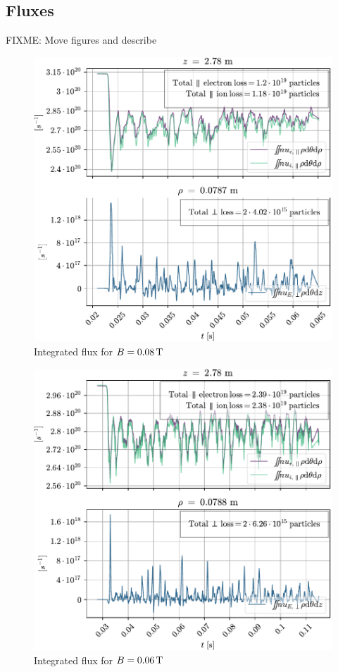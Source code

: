 \subsection{Fluxes}
FIXME: Move figures and describe
%
\begin{figure}[htb]
    \centering
    \includegraphics{fig/results/totalFlux/flux0008}
    \caption{Integrated flux for $B=0.08\, \text{T}$}
    \label{fig:flux0008}
\end{figure}
%
\begin{figure}[htb]
    \centering
    \includegraphics{fig/results/totalFlux/flux0006}
    \caption{Integrated flux for $B=0.06\, \text{T}$}
    \label{fig:flux0006}
\end{figure}
